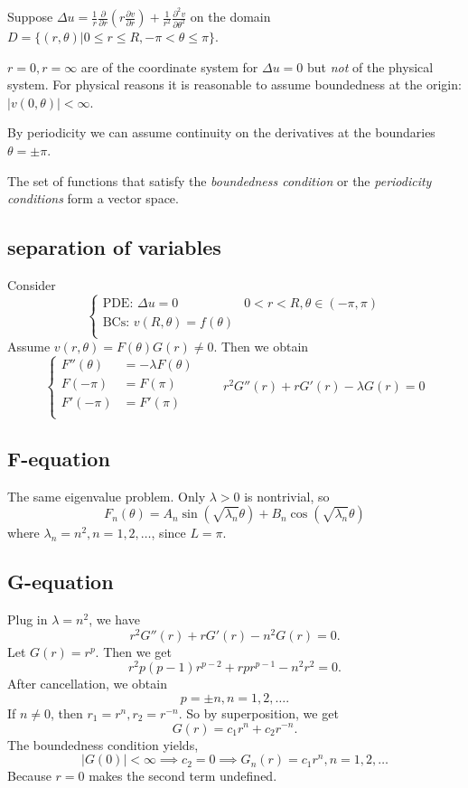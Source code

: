 \documentclass[class=article,crop=false]{standalone}
\begin{document}
\begin{eg}
	Suppose $ \Delta u = \frac{1}{r} \frac{\partial }{\partial r} \left( r \frac{\partial v}{\partial r}  \right) + \frac{1}{r^2} \frac{\partial^2 v}{\partial { \theta}^2} $ on the domain $ D=\{(r,\theta)|0\leq r \leq R, -\pi<\theta\leq \pi\} $.

	\begin{note}[]
		$ r=0,r=\infty$ are  of the coordinate system for $ \Delta u=0$ but \emph{not} of the physical system.  For physical reasons it is reasonable to assume boundedness at the origin: $ |v(0, \theta)|< \infty$.
	\end{note}
	By periodicity we can assume continuity on the derivatives at the boundaries $ \theta=\pm \pi$.

	\begin{claim}[]
	The set of functions that satisfy the \emph{boundedness condition} or the \emph{periodicity conditions} form a vector space.  
	\end{claim}
\subsection{separation of variables}
Consider
\begin{equation*}
\begin{cases}
	\text{PDE: } \Delta u=0 & 0<r<R, \theta \in (-\pi,\pi) \\
	\text{BCs: }  v(R,\theta) = f(\theta) &  \\
\end{cases}
\end{equation*}
Assume $ v(r,\theta) = F(\theta)G(r) \neq 0$. Then we obtain
\begin{equation*}
\begin{cases}
	F''(\theta)&= -\lambda F(\theta) \\
	F(-\pi)&=F(\pi)\\
	F'(-\pi) &= F'(\pi) \\
\end{cases}
\qquad r^2G''(r)+rG'(r)-\lambda G(r)=0
\end{equation*}
\subsection{F-equation}
The same eigenvalue problem. Only $ \lambda>0$ is nontrivial, so
\[
	F_n(\theta)=A_n \sin(\sqrt{\lambda_n} \theta  )+ B_n\cos(\sqrt{\lambda_n}\theta  ) 
\] 
where $ \lambda_n=n^2,n=1,2,\ldots$, since $ L=\pi$.
\subsection{G-equation}
Plug in $ \lambda=n^2$, we have
\[
	r^2G''(r)+rG'(r)-n^2G(r)=0
.\] 
Let $ G(r)=r^{p}$. Then we get
\[
	r^2 p(p-1)r^{p-2} + r p r^{p-1}-n^2 r^2 = 0
.\] 
After cancellation, we obtain
\[
p=\pm n,n=1,2,\ldots
.\]
If $ n\neq 0$, then  $ r_1=r^{n}, r_2=r^{-n}$. So by superposition, we get 
\[
	G(r)=c_1 r^{n} + c_2 r^{-n}
.\] 
The boundedness condition yields,
\[
	|G(0)|<\infty \implies c_2 =0 \implies G_n(r)=c_1 r^{n}, n=1,2,\ldots
\]
Because $ r=0$ makes the second term undefined.


\end{eg}
\end{document}
